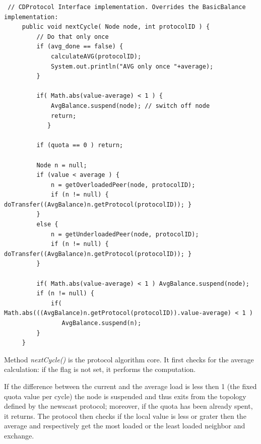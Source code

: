 \documentclass[a4paper,11pt]{article}
\begin{document}
\footnotesize
\begin{verbatim}
 // CDProtocol Interface implementation. Overrides the BasicBalance implementation:
     public void nextCycle( Node node, int protocolID ) {
         // Do that only once
         if (avg_done == false) {
             calculateAVG(protocolID);
             System.out.println("AVG only once "+average);
         }
    
         if( Math.abs(value-average) < 1 ) {
             AvgBalance.suspend(node); // switch off node
             return;
            }
     
         if (quota == 0 ) return;
     
         Node n = null;
         if (value < average ) {
             n = getOverloadedPeer(node, protocolID);
             if (n != null) { doTransfer((AvgBalance)n.getProtocol(protocolID)); } 
         }
         else {
             n = getUnderloadedPeer(node, protocolID);
             if (n != null) { doTransfer((AvgBalance)n.getProtocol(protocolID)); } 
         } 
     
         if( Math.abs(value-average) < 1 ) AvgBalance.suspend(node);
         if (n != null) {
             if( Math.abs(((AvgBalance)n.getProtocol(protocolID)).value-average) < 1 ) 
	            AvgBalance.suspend(n);
         }
     }
\end{verbatim}
\normalsize

Method \emph{nextCycle()} is the protocol algorithm core. It first
checks for the average calculation: if the flag is not set, it performs
the computation.

If the difference between the current and the average load is less
then 1 (the fixed quota value per cycle) the node is suspended and
thus exits from the topology defined by the newscast protocol; moreover,
if the quota has been already spent, it returns. The protocol then
checks if the local value is less or grater then the average and respectively
get the most loaded or the least loaded neighbor and exchange.\\
\end{document}
